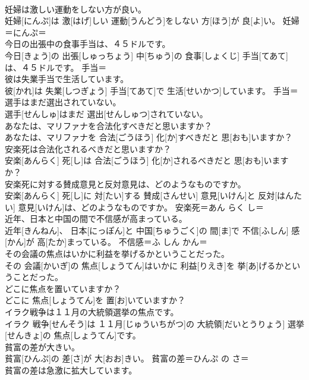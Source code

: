 \documentclass[8pt]{extreport}
\begin{document}
\begin{CJK}{UTF8}{min}
\\	妊婦は激しい運動をしない方が良い。	
\\	妊婦[にんぷ]は 激[はげ]しい 運動[うんどう]をしない 方[ほう]が 良[よ]い。	妊婦＝にんぷ＝ 
\\	今日の出張中の食事手当は、４５ドルです。	
\\	今日[きょう]の 出張[しゅっちょう] 中[ちゅう]の 食事[しょくじ] 手当[てあて]は、４５ドルです。	手当＝ 
\\	彼は失業手当で生活しています。	
\\	彼[かれ]は 失業[しつぎょう] 手当[てあて]で 生活[せいかつ]しています。	手当＝ 
\\	選手はまだ選出されていない。	
\\	選手[せんしゅ]はまだ 選出[せんしゅつ]されていない。	
\\	あなたは、マリファナを合法化すべきだと思いますか？	
\\	あなたは、マリファナを 合法[ごうほう] 化[か]すべきだと 思[おも]いますか？	
\\	安楽死は合法化されるべきだと思いますか？	
\\	安楽[あんらく] 死[し]は 合法[ごうほう] 化[か]されるべきだと 思[おも]いますか？	
\\	安楽死に対する賛成意見と反対意見は、どのようなものですか。	
\\	安楽[あんらく] 死[し]に 対[たい]する 賛成[さんせい] 意見[いけん]と 反対[はんたい] 意見[いけん]は、どのようなものですか。	安楽死＝あん らく し＝ 
\\	近年、日本と中国の間で不信感が高まっている。	
\\	近年[きんねん]、 日本[にっぽん]と 中国[ちゅうごく]の 間[ま]で 不信[ふしん] 感[かん]が 高[たか]まっている。	不信感＝ふ しん かん＝ 
\\	その会議の焦点はいかに利益を挙げるかということだった。	
\\	その 会議[かいぎ]の 焦点[しょうてん]はいかに 利益[りえき]を 挙[あ]げるかということだった。	
\\	どこに焦点を置いていますか？	
\\	どこに 焦点[しょうてん]を 置[お]いていますか？	
\\	イラク戦争は１１月の大統領選挙の焦点です。	
\\	イラク 戦争[せんそう]は １１月[じゅういちがつ]の 大統領[だいとうりょう] 選挙[せんきょ]の 焦点[しょうてん]です。	
\\	貧富の差が大きい。	
\\	貧富[ひんぷ]の 差[さ]が 大[おお]きい。	貧富の差＝ひんぷ の さ＝ 
\\	貧富の差は急激に拡大しています。	

\end{CJK}
\end{document}
